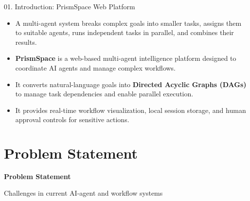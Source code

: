 \documentclass[aspectratio=169,10pt]{beamer}
\begin{document}
\begin{frame}[c]{01. Introduction: PrismSpace Web Platform}
\centering
\begin{minipage}{0.94\linewidth}
\begin{tcolorbox}[
  enhanced, arc=5pt, colframe=lavenderDark!80, colback=lavenderLight!25,
  boxrule=0.9pt,
  left=14pt, right=14pt, top=12pt, bottom=12pt
]
\fontsize{8.6}{12.6}\selectfont\sffamily\color{lavenderDeep}
  \begin{itemize}
    \setlength{\itemsep}{10pt}
    \item A multi-agent system breaks complex goals into smaller tasks, assigns them to suitable agents, runs independent tasks in parallel, and combines their results.
    \item \textbf{PrismSpace} is a web-based multi-agent intelligence platform designed to coordinate AI agents and manage complex workflows.
    \item It converts natural-language goals into \textbf{Directed Acyclic Graphs (DAGs)} to manage task dependencies and enable parallel execution.
    \item It provides real-time workflow visualization, local session storage, and human approval controls for sensitive actions.
  \end{itemize}
\end{tcolorbox}
\end{minipage}
\end{frame}

\section{Problem Statement}

\begin{frame}[plain]
\vfill
\begin{center}
  {\color{lavenderDark}\fontsize{25}{30}\selectfont\bfseries Problem Statement\par}
  \vspace{0.45em}
  {\color{prismTeal!85!black}\large Challenges in current AI-agent and workflow systems}
\end{center}
\vfill
\end{frame}
\end{document}
